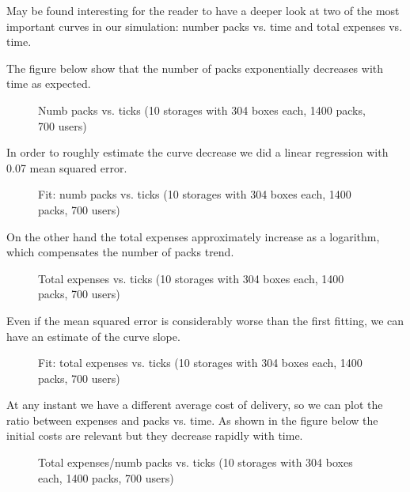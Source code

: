 \documentclass[11pt,a4paper]{article}
\begin{document}
\newpage 
May be found interesting for the reader to have a deeper look at two of the most important curves in our simulation: number packs vs. time and total expenses vs. time. 

The figure below show that the number of packs exponentially decreases with time as expected.

\begin{figure}[h!]
\centering
\caption{Numb packs vs. ticks (10 storages with 304 boxes each, 1400 packs, 700 users)}
\end{figure}

In order to roughly estimate the curve decrease we did a linear regression with 0.07 mean squared error.

\begin{figure}[h!]
\centering
\caption{Fit: numb packs vs. ticks (10 storages with 304 boxes each, 1400 packs, 700 users)}
\end{figure}

\newpage
On the other hand the total expenses approximately increase as a logarithm, which compensates the number of packs trend.

\begin{figure}[h!]
\centering
\caption{Total expenses vs. ticks (10 storages with 304 boxes each, 1400 packs, 700 users)}
\end{figure}

Even if the mean squared error is considerably worse than the first fitting, we can have an estimate of the curve slope.

\begin{figure}[h!]
\centering
\caption{Fit: total expenses vs. ticks (10 storages with 304 boxes each, 1400 packs, 700 users)}
\end{figure}

\newpage
At any instant we have a different average cost of delivery, so we can plot the ratio between expenses and packs vs. time. As shown in the figure below the initial costs are relevant but they decrease rapidly with time.

\begin{figure}[h!]
\centering
\caption{Total expenses/numb packs vs. ticks (10 storages with 304 boxes each, 1400 packs, 700 users)}
\end{figure}
 
\end{document}
